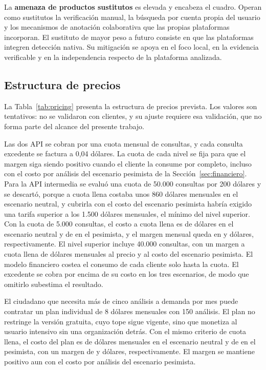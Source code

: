 La \textbf{amenaza de productos sustitutos} es elevada y encabeza el cuadro. Operan como sustitutos la verificación manual, la búsqueda por cuenta propia del usuario y los mecanismos de anotación colaborativa que las propias plataformas incorporan. El sustituto de mayor peso a futuro consiste en que las plataformas integren detección nativa. Su mitigación se apoya en el foco local, en la evidencia verificable y en la independencia respecto de la plataforma analizada.

\subsection{Estructura de precios}

La Tabla~\ref{tab:pricing} presenta la estructura de precios prevista. Los valores son tentativos: no se validaron con clientes, y su ajuste requiere esa validación, que no forma parte del alcance del presente trabajo.

Las dos API se cobran por una cuota mensual de consultas, y cada consulta excedente se factura a 0,04 dólares. La cuota de cada nivel se fija para que el margen siga siendo positivo cuando el cliente la consume por completo, incluso con el costo por análisis del escenario pesimista de la Sección~\ref{sec:financiero}. Para la API intermedia se evaluó una cuota de 50.000 consultas por 200 dólares y se descartó, porque a cuota llena costaba unos 860 dólares mensuales en el escenario neutral, y cubrirla con el costo del escenario pesimista habría exigido una tarifa superior a los 1.500 dólares mensuales, el mínimo del nivel superior. Con la cuota de 5.000 consultas, el costo a cuota llena es de \finCostoIntermediaNeu{} dólares en el escenario neutral y de \finCostoIntermediaPes{} en el pesimista, y el margen mensual queda en \finMargenIntermediaNeu{} y \finMargenIntermediaPes{} dólares, respectivamente. El nivel superior incluye 40.000 consultas, con un margen a cuota llena de \finMargenSuperiorPes{} dólares mensuales al precio y al costo del escenario pesimista. El modelo financiero costea el consumo de cada cliente solo hasta la cuota. El excedente se cobra por encima de su costo en los tres escenarios, de modo que omitirlo subestima el resultado.

El ciudadano que necesita más de cinco análisis a demanda por mes puede contratar un plan individual de 8 dólares mensuales con 150 análisis. El plan no restringe la versión gratuita, cuyo tope sigue vigente, sino que monetiza al usuario intensivo sin una organización detrás. Con el mismo criterio de cuota llena, el costo del plan es de \finCostoIndividualNeu{} dólares mensuales en el escenario neutral y de \finCostoIndividualPes{} en el pesimista, con un margen de \finMargenIndividualNeu{} y \finMargenIndividualPes{} dólares, respectivamente. El margen se mantiene positivo aun con el costo por análisis del escenario pesimista.

